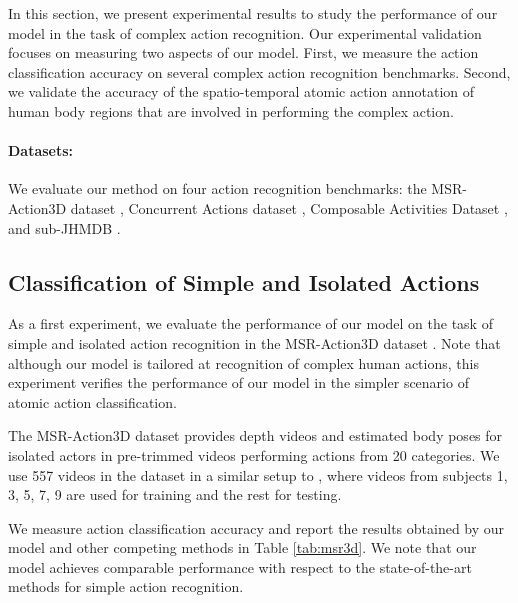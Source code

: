 In this section, we present experimental results to study the performance
of our model in the task of complex action recognition. Our experimental
validation focuses on measuring two aspects of our model.
First, we measure the action classification accuracy on
several complex action recognition benchmarks.
Second, we validate the accuracy of the spatio-temporal atomic action
annotation of human body regions that are involved in performing the complex
action.


\paragraph{Datasets:}
We evaluate our method on four action recognition benchmarks:
the MSR-Action3D dataset \cite{WanLi2010},
Concurrent Actions dataset \cite{Wei2013},
Composable Activities Dataset \cite{Lillo2014}, and sub-JHMDB
\cite{Jhuang2013}.


\subsection{Classification of Simple and Isolated Actions}

As a first experiment,
we evaluate the performance of our model on the task of simple and
isolated action recognition in the  MSR-Action3D dataset \cite{WanLi2010}.
Note that although our model is tailored at recognition of complex human
actions, this experiment verifies the performance of our model in the
simpler scenario of atomic action classification.

The MSR-Action3D dataset provides depth videos and estimated body poses
for isolated actors in pre-trimmed videos performing actions from 20
categories. We use 557 videos in the dataset in a similar setup to
\cite{Wang2012}, where videos from subjects 1, 3, 5, 7, 9 are used for
training and the rest for testing.

We measure action classification accuracy and report the results obtained
by our model and other competing methods in Table \ref{tab:msr3d}.
We note that our model achieves comparable performance with respect
to the state-of-the-art methods for simple action recognition.

